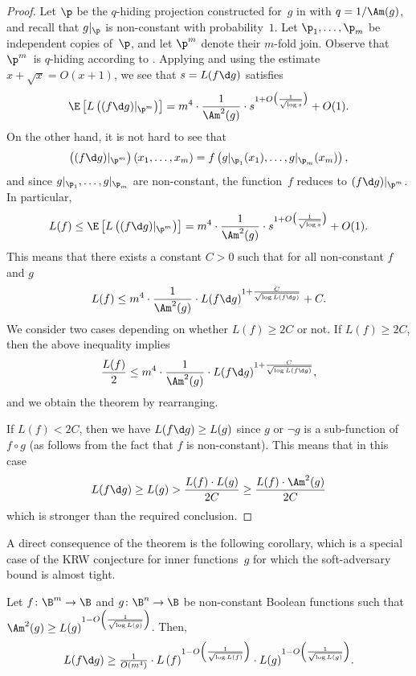 \documentclass{toc}
\begin{document}
\begin{proof}
Let $\p$ be the $q$-hiding projection constructed for~$g$ in 
with $q=1/\Am(g)$, and recall that $g|_{\p}$ is non-constant with
probability~$1$. Let $\p_{1},\ldots,\p_{m}$ be independent copies
of~$\p$, and let $\p^{m}$ denote their $m$-fold join. Observe
that $\p^{m}$~is $q$-hiding according to .
Applying  
and using the estimate
$x+\sqrt{x}=O(x+1)$, we see that $s=L(f\d g)$ satisfies 
\[
\E\left[L\left((f\d g)|_{\p^{m}}\right)\right]=m^{4}\cdot\frac{1}{\Am^{2}(g)}\cdot s^{1+O\bigl(\frac{1}{\sqrt{\log s}}\bigr)}+O(1).
\]
On the other hand, it is not hard to see that 
\[
\left((f\d g)|_{\p^{m}}\right)(x_{1},\ldots,x_{m})=f\left(g|_{\p_{1}}(x_{1}),\ldots,g|_{\p_{m}}(x_{m})\right),
\]
and since $g|_{\p_{1}},\ldots,g|_{\p_{m}}$ are non-constant, the
function~$f$ reduces to $(f\d g)|_{\p^{m}}$. In particular, 
\[
L(f)\le\E\left[L\left((f\d g)|_{\p^{m}}\right)\right]=m^{4}\cdot\frac{1}{\Am^{2}(g)}\cdot s^{1+O\bigl(\frac{1}{\sqrt{\log s}}\bigr)}+O(1).
\]
This means that there exists a constant $C>0$ such that for all non-constant $f$ and $g$
\[
L(f)\le m^{4}\cdot\frac{1}{\Am^{2}(g)}\cdot L(f\d g)^{1+\frac{C}{\sqrt{\log L(f\d g)}}}+C.\]
We consider two cases depending on whether $L(f)\ge 2C$ or not. 
If $L(f) \ge 2C$, then the above inequality implies
\[\frac{L(f)}{2}\le m^{4}\cdot\frac{1}{\Am^{2}(g)}\cdot L(f\d g)^{1+\frac{C}{\sqrt{\log L(f\d g)}}},\]
 and we obtain the theorem by rearranging. 

If $L(f) < 2C$, then we have $L(f\d g) \ge L(g)$ since $g$ or $\neg g$ is a sub-function of $f\circ g$ (as follows from the fact that $f$ is non-constant).
This means that in this case 
\[L(f\d g) \ge L(g) > \frac{L(f) \cdot L(g)}{2C} \ge \frac{L(f) \cdot \Am^2(g)}{2C}
\]
which is stronger than the required conclusion.
\end{proof}
A direct consequence of the theorem is the following corollary, which
is a special case of the KRW conjecture for inner functions~$g$
for which the soft-adversary bound is almost tight. 
\begin{corollary}
\label{cor:KRW-special-case}Let $f\colon\B^{m}\to\B$ and $g\colon\B^{n}\to\B$
be non-constant Boolean functions such that $\Am^{2}(g)\ge L(g)^{1-O\left(\frac{1}{\sqrt{\log L(g)}}\right)}$.
Then, 
\[
L(f\d g)\ge\tfrac{1}{O(m^{4})}\cdot L\left(f\right)^{1-O\left(\frac{1}{\sqrt{\log L(f)}}\right)}\cdot L(g)^{1-O\left(\frac{1}{\sqrt{\log L(g)}}\right)}.
\]
\end{corollary}
%
%
\end{document}
